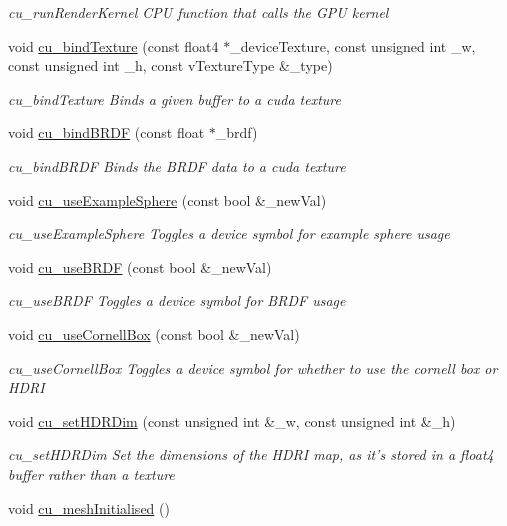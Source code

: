 \begin{DoxyCompactItemize}
\begin{DoxyCompactList}\small\item\em cu\-\_\-run\-Render\-Kernel C\-P\-U function that calls the G\-P\-U kernel \end{DoxyCompactList}\item 
void \hyperlink{PathTracer_8cu_a3c5a077c055656ec04072e241cb8abd9}{cu\-\_\-bind\-Texture} (const float4 $\ast$\-\_\-device\-Texture, const unsigned int \-\_\-w, const unsigned int \-\_\-h, const v\-Texture\-Type \&\-\_\-type)
\begin{DoxyCompactList}\small\item\em cu\-\_\-bind\-Texture Binds a given buffer to a cuda texture \end{DoxyCompactList}\item 
void \hyperlink{PathTracer_8cu_a96b4e745cacc70a0e1007d7df5176864}{cu\-\_\-bind\-B\-R\-D\-F} (const float $\ast$\-\_\-brdf)
\begin{DoxyCompactList}\small\item\em cu\-\_\-bind\-B\-R\-D\-F Binds the B\-R\-D\-F data to a cuda texture \end{DoxyCompactList}\item 
void \hyperlink{PathTracer_8cu_a0ebc9aa3ce310c2cd3c99793c212aefa}{cu\-\_\-use\-Example\-Sphere} (const bool \&\-\_\-new\-Val)
\begin{DoxyCompactList}\small\item\em cu\-\_\-use\-Example\-Sphere Toggles a device symbol for example sphere usage \end{DoxyCompactList}\item 
void \hyperlink{PathTracer_8cu_adf3705d0e2ca2e89001457104fefd218}{cu\-\_\-use\-B\-R\-D\-F} (const bool \&\-\_\-new\-Val)
\begin{DoxyCompactList}\small\item\em cu\-\_\-use\-B\-R\-D\-F Toggles a device symbol for B\-R\-D\-F usage \end{DoxyCompactList}\item 
void \hyperlink{PathTracer_8cu_a84c7787fce87bcd3aecd756480fba258}{cu\-\_\-use\-Cornell\-Box} (const bool \&\-\_\-new\-Val)
\begin{DoxyCompactList}\small\item\em cu\-\_\-use\-Cornell\-Box Toggles a device symbol for whether to use the cornell box or H\-D\-R\-I \end{DoxyCompactList}\item 
void \hyperlink{PathTracer_8cu_a57be5801cbad9c51e6ab73ea59a32c62}{cu\-\_\-set\-H\-D\-R\-Dim} (const unsigned int \&\-\_\-w, const unsigned int \&\-\_\-h)
\begin{DoxyCompactList}\small\item\em cu\-\_\-set\-H\-D\-R\-Dim Set the dimensions of the H\-D\-R\-I map, as it's stored in a float4 buffer rather than a texture \end{DoxyCompactList}\item 
\hypertarget{PathTracer_8cu_aed211bb31208e488f637a15f9a68587e}{void \hyperlink{PathTracer_8cu_aed211bb31208e488f637a15f9a68587e}{cu\-\_\-mesh\-Initialised} ()}\label{PathTracer_8cu_aed211bb31208e488f637a15f9a68587e}


\end{DoxyCompactItemize}
